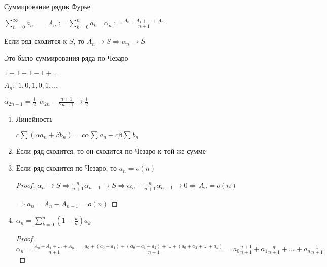 
Суммирование рядов Фурье

\begin{definition}\thmslashn

	$\sum\limits_{n = 0}^{\infty} a_n \qquad A_n := \sum\limits_{k = 0}^{n} a_k \quad \alpha_n := \frac{A_0 + A_1 + \ldots + A_n}{n+1}$
	
	Если ряд сходится к $S$, то $A_n \to S \Rightarrow \alpha_n\to S$

	Это было суммирования ряда по Чезаро
	
\end{definition}

\begin{example}\thmslashn
	
	$1- 1 + 1 - 1+ \ldots$
	
	$A_n: \,\,1 , 0, 1, 0, 1, \ldots$
	
	$\alpha_{2n - 1} = \frac{1}{2}\,\,\,\alpha_{2n} - \frac{n + 1}{2n+1} \to \frac{1}{2}$
	
\end{example}

\begin{consequences}\thmslashn

	\begin{enumerate}
		\item 
		Линейность 
		
		$c\sum (\alpha a_n + \beta b_n) = c\alpha\sum a_n + c\beta \sum b_n$
		
		\item 
		Если ряд сходится, то он сходится по Чезаро к той же сумме
		
		\item
		Если ряд сходится по Чезаро, то $a_n = o(n)$
		
		\begin{proof}\thmslashn
			
			$\alpha_n \to S \Rightarrow \frac{n}{n+1} \alpha_{n-1} \to S \Rightarrow \alpha_n - \frac{n}{n+1} \alpha_{n-1} \to 0 \Rightarrow A_n = o(n)$
			
			$\Rightarrow a_n = A_n - A_{n-1} = o(n)$
			
		\end{proof}
	
		\item
		$\alpha_n = \sum\limits_{k = 0}^n \left( 1 - \frac{k}{n} \right)a_k$
		
		\begin{proof}\thmslashn
			
		$\alpha_n = \frac{A_0 + A_1 + \ldots + A_n}{n+1} = \frac{a_0 + (a_0 + a_1) + (a_0 + a_1 + a_2) + \ldots + (a_0 + a_1 + \ldots + a_n)}{n+1} = a_0 \frac{n+1}{n+1} + a_1\frac{n}{n+1} + \ldots + a_n\frac{1}{n+1}$
			
		\end{proof}
	
	\end{enumerate}

\end{consequences}

